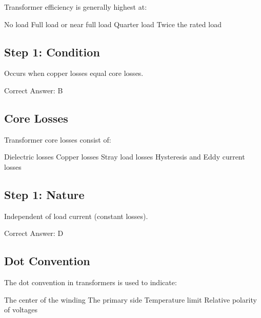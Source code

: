Transformer efficiency is generally highest at:

\begin{choices}
    \choice No load
    \correctchoice Full load or near full load
    \choice Quarter load
    \choice Twice the rated load
\end{choices}

\begin{solution}

\subsection*{Step 1: Condition}
Occurs when copper losses equal core losses.

Correct Answer: B
\end{solution}

\clearpage

\subsection{Core Losses}

Transformer core losses consist of:

\begin{choices}
    \choice Dielectric losses
    \choice Copper losses
    \choice Stray load losses
    \correctchoice Hysteresis and Eddy current losses
\end{choices}

\begin{solution}

\subsection*{Step 1: Nature}
Independent of load current (constant losses).

Correct Answer: D
\end{solution}

\clearpage

\subsection{Dot Convention}

The dot convention in transformers is used to indicate:

\begin{choices}
    \choice The center of the winding
    \choice The primary side
    \choice Temperature limit
    \correctchoice Relative polarity of voltages
\end{choices}

